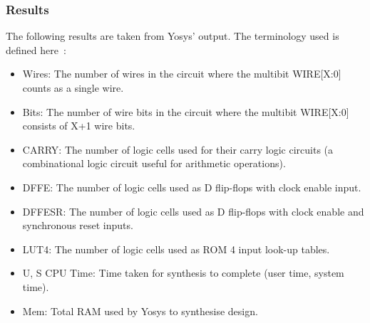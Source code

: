 \documentclass[12pt]{article}
\begin{document}
    \subsubsection{Results} \label{subsubsection:scaling_results}
      The following results are taken from Yosys' output. The terminology used is defined here~\cite{techlib}:
      \begin{itemize}
        \item Wires: The number of wires in the circuit where the multibit WIRE[X:0] counts as a single wire.
        \item Bits: The number of wire bits in the circuit where the multibit WIRE[X:0] consists of X+1 wire bits.
        \item CARRY: The number of logic cells used for their carry logic circuits (a combinational logic circuit useful for arithmetic operations).
        \item DFFE: The number of logic cells used as D flip-flops with clock enable input.
        \item DFFESR: The number of logic cells used as D flip-flops with clock enable and synchronous reset inputs.
        \item LUT4: The number of logic cells used as ROM 4 input look-up tables.
        \item U, S CPU Time: Time taken for synthesis to complete (user time, system time).
        \item Mem: Total RAM used by Yosys to synthesise design.
      \end{itemize}
\end{document}
